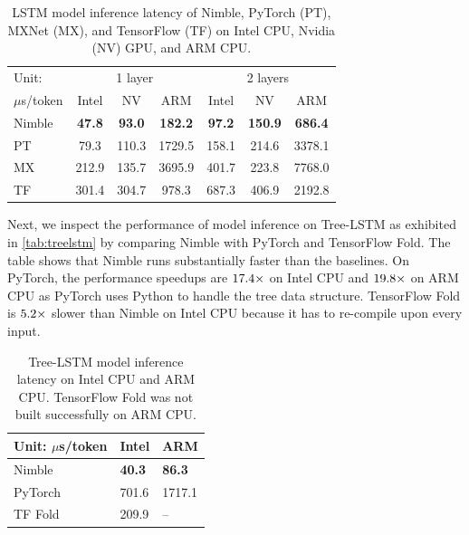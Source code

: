 \begin{table}[t]
\centering
\small
\begin{tabular}{p{0.9cm}|ccc|ccc}
\toprule
Unit: & \multicolumn{3}{c|}{1 layer} & \multicolumn{3}{c}{2 layers} \\
$\mu$s/token & Intel & NV & ARM & Intel & NV & ARM \\ \midrule
Nimble & \bf{47.8} & \bf{93.0} & \bf{182.2} & \bf{97.2} & \bf{150.9} & \bf{686.4} \\
PT & 79.3 & 110.3 & 1729.5 & 158.1 & 214.6 & 3378.1 \\
MX  & 212.9 & 135.7 & 3695.9 & 401.7 & 223.8 & 7768.0 \\
TF & 301.4 & 304.7 & 978.3 & 687.3 & 406.9 & 2192.8 \\
\bottomrule
\end{tabular}
\caption{LSTM model inference latency of Nimble, PyTorch (PT), MXNet (MX), and TensorFlow (TF) on Intel CPU, Nvidia (NV) GPU, and ARM CPU.}
\label{tab:lstm}
\vspace{-1em}
\end{table}

Next, we inspect the performance of model inference on Tree-LSTM as exhibited in \autoref{tab:treelstm} by comparing Nimble with PyTorch and TensorFlow Fold. The table shows that Nimble runs substantially faster than the baselines. On PyTorch, the performance speedups are $\fpeval{round(701.1/40.3, 1)}\times$ on Intel CPU and $\fpeval{round(1711.1/86.3, 1)}\times$ on ARM CPU as PyTorch uses Python to handle the tree data structure. TensorFlow Fold is $\fpeval{round(209.9/40.3, 1)}\times$ slower than Nimble on Intel CPU because it has to re-compile upon every input.

\begin{table}[t]
\centering
\begin{tabular}{l|ll}
\toprule
Unit: $\mu$s/token        & Intel     & ARM \\ \midrule
Nimble  & \bf{40.3}  & \bf{86.3}  \\
PyTorch & 701.6 & 1717.1  \\
TF Fold & 209.9 & --  \\
\bottomrule
\end{tabular}
\caption{Tree-LSTM model inference latency on Intel CPU and ARM CPU. TensorFlow Fold was not built successfully on ARM CPU.}
\label{tab:treelstm}
\end{table}

